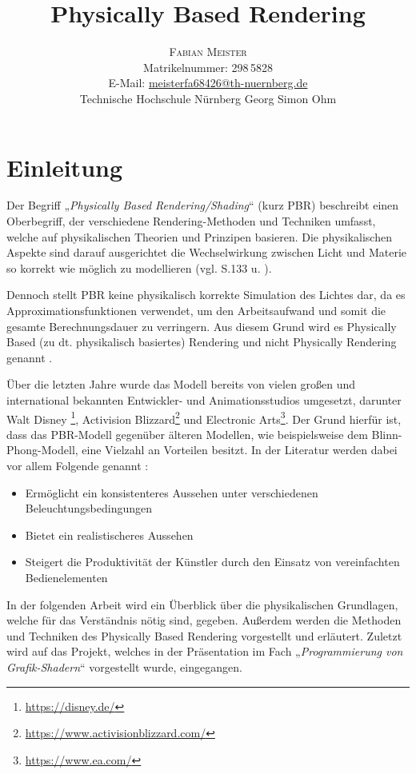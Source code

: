 \documentclass[
  11pt,
  a4paper,
  oneside
  ]{article}
\title{Physically Based Rendering} %
\author{%
\textsc{Fabian Meister} \\[1ex] %
\normalsize Matrikelnummer: 298\,5828 \\ %
\normalsize E-Mail: \href{mailto:meisterfa68426@th-nuernberg.de}{meisterfa68426@th-nuernberg.de} \\%
\normalsize Technische Hochschule Nürnberg Georg Simon Ohm \\ %
}
\date{} %
\begin{document}
\maketitle


\section{Einleitung}
Der Begriff „\textit{Physically Based Rendering/Shading}“ (kurz PBR) beschreibt einen Oberbegriff, der verschiedene Rendering-Methoden und Techniken umfasst, welche auf physikalischen Theorien und Prinzipen basieren. Die physikalischen Aspekte sind darauf ausgerichtet die Wechselwirkung zwischen Licht und Materie so korrekt wie möglich zu modellieren
(vgl. S.133 \cite{openGlWolf} u. \cite{learnOpenGL}).

Dennoch stellt PBR keine physikalisch korrekte Simulation des Lichtes dar, da es Approximationsfunktionen verwendet, um den Arbeitsaufwand und somit die gesamte Berechnungsdauer zu verringern. Aus diesem Grund wird es Physically Based (zu dt. physikalisch basiertes) Rendering und nicht Physically Rendering genannt
\cite{learnOpenGL}.

Über die letzten Jahre wurde das Modell bereits von vielen großen und international bekannten Entwickler- und Animationsstudios umgesetzt, darunter Walt Disney
\footnote{\url{https://disney.de/}}, Activision Blizzard\footnote{\url{https://www.activisionblizzard.com/}} und Electronic Arts\footnote{\url{https://www.ea.com/}}. 
Der Grund hier\-für ist, dass das PBR-Modell gegenüber älteren Modellen, wie beispielsweise dem Blinn-Phong-Modell, eine Vielzahl an Vorteilen besitzt. In der Literatur werden dabei vor allem Folgende genannt 
\cite{reasonsForPbr1,reasonsForPbr2,pbrGuide,learnOpenGL}:
\begin{itemize}
  \item Ermöglicht ein konsistenteres Aussehen unter verschiedenen Beleuchtungsbedingungen 
  \item Bietet ein realistischeres Aussehen
  \item Steigert die Produktivität der Künstler durch den Einsatz von vereinfachten Bedienelementen
\end{itemize}

In der folgenden Arbeit wird ein Überblick über die physikalischen Grundlagen, welche für das Verständnis nötig sind, gegeben. Außerdem werden die Methoden und Techniken des Physically Based Rendering vorgestellt und erläutert. Zuletzt wird auf das Projekt, welches in der Präsentation im Fach „\textit{Programmierung von Grafik-Shadern}“ vorgestellt wurde, eingegangen. 
\end{document}
